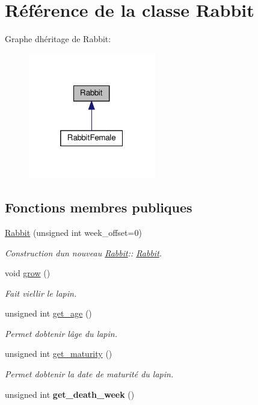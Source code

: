 \hypertarget{classRabbit}{}\section{Référence de la classe Rabbit}
\label{classRabbit}


Graphe d\textquotesingle{}héritage de Rabbit\+:\nopagebreak
\begin{figure}[H]
\begin{center}
\leavevmode
\includegraphics[width=157pt]{classRabbit__inherit__graph}
\end{center}
\end{figure}
\subsection*{Fonctions membres publiques}
\begin{DoxyCompactItemize}
\item 
\hyperlink{classRabbit_aaddfbafa67919bec58e9a32e65946cd9}{Rabbit} (unsigned int week\+\_\+offset=0)
\begin{DoxyCompactList}\small\item\em Construction d\textquotesingle{}un nouveau \hyperlink{classRabbit}{Rabbit}\+:\+: \hyperlink{classRabbit}{Rabbit}. \end{DoxyCompactList}\item 
void \hyperlink{classRabbit_a404af8877c99ddc98108d88c8e466013}{grow} ()
\begin{DoxyCompactList}\small\item\em Fait viellir le lapin. \end{DoxyCompactList}\item 
unsigned int \hyperlink{classRabbit_acf461328f7979c337f17d61fd6c6750b}{get\+\_\+age} ()
\begin{DoxyCompactList}\small\item\em Permet d\textquotesingle{}obtenir l\textquotesingle{}âge du lapin. \end{DoxyCompactList}\item 
unsigned int \hyperlink{classRabbit_aedcad8063a668372630c56bdaf2520da}{get\+\_\+maturity} ()
\begin{DoxyCompactList}\small\item\em Permet d\textquotesingle{}obtenir la date de maturité du lapin. \end{DoxyCompactList}\item 
\mbox{\label{classRabbit_a2cab4ce38fcf10950adfdf4141f516c3}} 
unsigned int {\bfseries get\+\_\+death\+\_\+week} ()
\end{DoxyCompactItemize}
